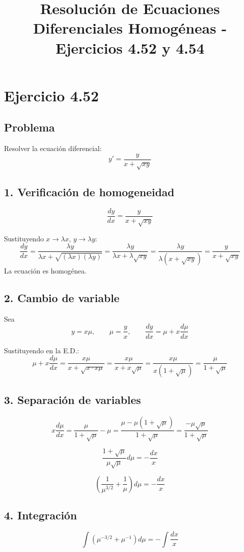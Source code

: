 \documentclass[a4paper,12pt]{article}
\title{Resolución de Ecuaciones Diferenciales Homogéneas - Ejercicios 4.52 y 4.54}
\author{}
\date{}
\begin{document}
\maketitle

\section{Ejercicio 4.52}
\subsection*{Problema}
Resolver la ecuación diferencial:
\[
y' = \frac{y}{x + \sqrt{xy}}
\]

\subsection*{1. Verificación de homogeneidad}
\[
\frac{dy}{dx} = \frac{y}{x + \sqrt{xy}}
\]

Sustituyendo $x \to \lambda x$, $y \to \lambda y$:
\[
\frac{dy}{dx} = \frac{\lambda y}{\lambda x + \sqrt{(\lambda x)(\lambda y)}} = \frac{\lambda y}{\lambda x + \lambda\sqrt{xy}} = \frac{\lambda y}{\lambda(x + \sqrt{xy})} = \frac{y}{x + \sqrt{xy}}
\]
La ecuación es homogénea.

\subsection*{2. Cambio de variable}
Sea 
\[
y = x\mu, \qquad \mu = \frac{y}{x}, \qquad \frac{dy}{dx} = \mu + x\frac{d\mu}{dx}
\]

Sustituyendo en la E.D.:
\[
\mu + x\frac{d\mu}{dx} = \frac{x\mu}{x + \sqrt{x \cdot x\mu}} = \frac{x\mu}{x + x\sqrt{\mu}} = \frac{x\mu}{x(1 + \sqrt{\mu})} = \frac{\mu}{1 + \sqrt{\mu}}
\]

\subsection*{3. Separación de variables}
\[
x\frac{d\mu}{dx} = \frac{\mu}{1 + \sqrt{\mu}} - \mu = \frac{\mu - \mu(1 + \sqrt{\mu})}{1 + \sqrt{\mu}} = \frac{-\mu\sqrt{\mu}}{1 + \sqrt{\mu}}
\]

\[
\frac{1 + \sqrt{\mu}}{\mu\sqrt{\mu}} d\mu = -\frac{dx}{x}
\]

\[
\left(\frac{1}{\mu^{3/2}} + \frac{1}{\mu}\right) d\mu = -\frac{dx}{x}
\]

\subsection*{4. Integración}
\[
\int \left(\mu^{-3/2} + \mu^{-1}\right) d\mu = -\int \frac{dx}{x}
\]
\end{document}
